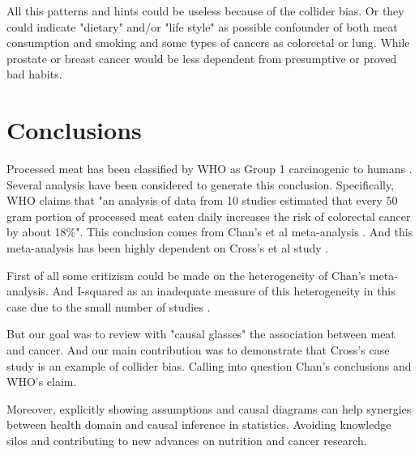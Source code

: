 \documentclass{article}
\begin{document}
All this patterns and hints could be useless because of the collider bias. Or they could indicate "dietary" and/or "life style" as possible confounder of both meat consumption and smoking and some types of cancers as colorectal or lung. While prostate or breast cancer would be less dependent from presumptive or proved bad habits. %


\section{Conclusions}

Processed meat has been classified by WHO as Group 1 carcinogenic to humans \cite{whoint}. Several analysis have been considered to generate this conclusion. Specifically, WHO claims that "an analysis of data from 10 studies estimated that every 50 gram portion of processed meat eaten daily increases the risk of colorectal cancer by about 18\%". This conclusion comes from Chan's et al meta-analysis \cite{chan}. And this meta-analysis has been highly dependent on Cross's et al study \cite{cross}.

First of all some critizism could be made on the heterogeneity of Chan's meta-analysis. And I-squared as an inadequate measure of this heterogeneity in this case due to the small number of studies \cite{hippel}.

But our goal was to review with "causal glasses" the association between meat and cancer. And our main contribution was to demonstrate that Cross's case study is an example of collider bias. Calling into question Chan's conclusions and WHO's claim.

Moreover, explicitly showing assumptions and causal diagrams can help synergies between health domain and causal inference in statistics. Avoiding knowledge silos and contributing to new advances on nutrition and cancer research.





\end{document}
